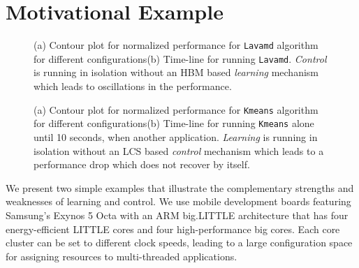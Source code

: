 \section{Motivational Example}
\label{sec:example}
\begin{figure}
  \subfloat[]
  {
    
    \label{fig:lavamd_timeline}
  }
  \caption{(a) Contour plot for normalized performance for \texttt{Lavamd} algorithm for different configurations(b) Time-line for running \texttt{Lavamd}. \emph{Control} is running in isolation without an HBM based \emph{learning} mechanism which leads to oscillations in the performance.}
  \label{fig:learning-models}
\end{figure}

\begin{figure}
  \subfloat[]
  {
    
    \label{fig:kmeans_timeline}    
  }
  \caption{(a) Contour plot for normalized performance for \texttt{Kmeans} algorithm for different configurations(b) Time-line for running \texttt{Kmeans} alone until 10 seconds, when another application. \emph{Learning} is running in isolation without an LCS based \emph{control} mechanism which leads to a performance drop which does not recover by itself.}
  \label{fig:learning-models}
\end{figure}

We present two simple examples that illustrate the complementary
strengths and weaknesses of learning and control.  We use mobile
development boards featuring Samsung's Exynos 5 Octa with an ARM
big.LITTLE architecture that has four energy-efficient LITTLE cores
and four high-performance big cores.  Each core cluster can be set to
different clock speeds, leading to a large configuration space for
assigning resources to multi-threaded applications.

